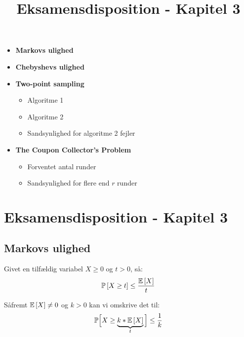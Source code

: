 
\title{Eksamensdisposition - Kapitel 3}


\maketitle

\begin{itemize}
  \item \textbf{Markovs ulighed}
  \item \textbf{Chebyshevs ulighed}
  \item \textbf{Two-point sampling}
  \begin{itemize}
    \item Algoritme 1
    \item Algoritme 2
    \item Sandsynlighed for algoritme 2 fejler
  \end{itemize}
  \item \textbf{The Coupon Collector's Problem}
  \begin{itemize}
    \item Forventet antal runder
    \item Sandsynlighed for flere end $r$ runder
  \end{itemize}
\end{itemize}


\newpage
\section{Eksamensdisposition - Kapitel 3}

\subsection{Markovs ulighed}
Givet en tilfældig variabel $X \geq 0$ og $t > 0$, så:
\begin{align}
  \mathbb{P} \left[  X \geq t  \right] \leq \frac{\mathbb{E} \left[  X  \right]}{t} \label{eq:markov}
\end{align}

Såfremt $\mathbb{E} \left[  X  \right] \neq 0$ og $k > 0$ kan vi omskrive det til:
$$
\mathbb{P} \Big[X \geq \underbrace{k * \mathbb{E} \left[  X  \right]}_{t} \Big] \leq \frac{1}{k}
$$

